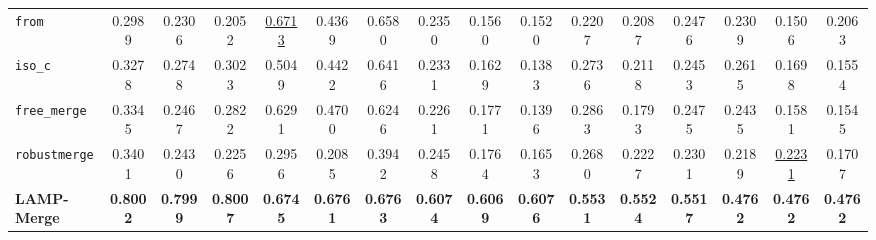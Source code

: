\documentclass[letterpaper]{article} %
\begin{document}
\begin{table}[t]
{\begin{tabular}{lccccccccccccccc}
\texttt{from} & 0.2989 & 0.2306 & 0.2052 & \underline{0.6713} & 0.4369 & 0.6580 & 0.2350 & 0.1560 & 0.1520 & 0.2207 & 0.2087 & 0.2476 & 0.2309 & 0.1506 & 0.2063 \\
\texttt{iso\_c} & 0.3278 & 0.2748 & 0.3023 & 0.5049 & 0.4422 & 0.6416 & 0.2331 & 0.1629 & 0.1383 & 0.2736 & 0.2118 & 0.2453 & 0.2615 & 0.1698 & 0.1554 \\
\texttt{free\_merge} & 0.3345 & 0.2467 & 0.2822 & 0.6291 & 0.4700 & 0.6246 & 0.2261 & 0.1771 & 0.1396 & 0.2863 & 0.1793 & 0.2475 & 0.2435 & 0.1581 & 0.1545 \\
\texttt{robustmerge} & 0.3401 & 0.2430 & 0.2256 & 0.2956 & 0.2085 & 0.3942 & 0.2458 & 0.1764 & 0.1653 & 0.2680 & 0.2227 & 0.2301 & 0.2189 & \underline{0.2231} & 0.1707 \\
\textbf{LAMP-Merge} & \textbf{0.8002} & \textbf{0.7999} & \textbf{0.8007} & \textbf{0.6745} & \textbf{0.6761} & \textbf{0.6763} & \textbf{0.6074} & \textbf{0.6069} & \textbf{0.6076} & \textbf{0.5531} & \textbf{0.5524} & \textbf{0.5517} & \textbf{0.4762} & \textbf{0.4762} & \textbf{0.4762} \\
\hline
\end{tabular}
}
\end{table}
\end{document}
